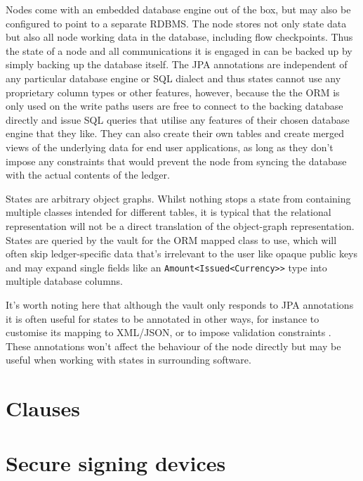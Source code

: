 \documentclass{article}
\begin{document}
Nodes come with an embedded database engine out of the box, but may also be configured to point to a separate RDBMS.
The node stores not only state data but also all node working data in the database, including flow checkpoints. Thus
the state of a node and all communications it is engaged in can be backed up by simply backing up the database itself.
The JPA annotations are independent of any particular database engine or SQL dialect and thus states cannot use any
proprietary column types or other features, however, because the the ORM is only used on the write paths users are free
to connect to the backing database directly and issue SQL queries that utilise any features of their chosen database
engine that they like. They can also create their own tables and create merged views of the underlying data for end
user applications, as long as they don't impose any constraints that would prevent the node from syncing the database
with the actual contents of the ledger.


States are arbitrary object graphs. Whilst nothing stops a state from containing multiple classes intended for different
tables, it is typical that the relational representation will not be a direct translation of the object-graph
representation. States are queried by the vault for the ORM mapped class to use, which will often skip ledger-specific
data that's irrelevant to the user like opaque public keys and may expand single fields like an \texttt{Amount<Issued<Currency>>}
type into multiple database columns.

It's worth noting here that although the vault only responds to JPA annotations it is often useful for states to be
annotated in other ways, for instance to customise its mapping to XML/JSON, or to impose validation constraints
\cite{BeanValidation}. These annotations won't affect the behaviour of the node directly but may be useful when working
with states in surrounding software.

\section{Clauses}

\section{Secure signing devices}\label{sec:secure-signing-devices}
\end{document}
